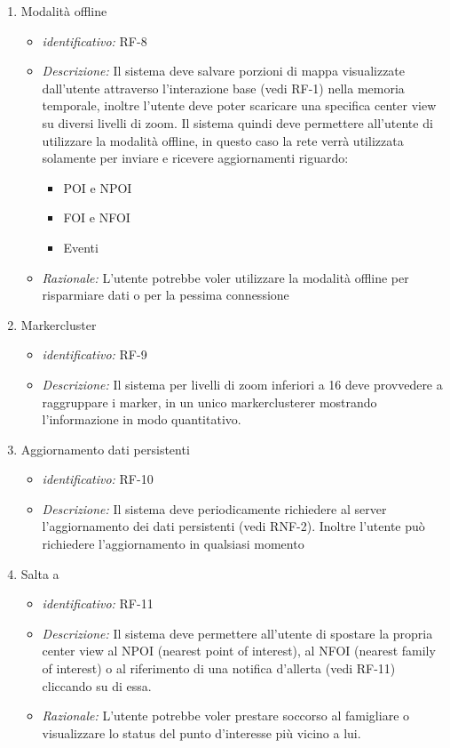 \begin{enumerate}
    \item Modalità offline
  \begin{itemize}
  \item\textit{identificativo:} RF-8
  \item\textit{Descrizione:} Il sistema deve salvare porzioni di mappa visualizzate dall’utente attraverso l’interazione base (vedi RF-1) nella memoria temporale, inoltre l’utente deve poter scaricare una specifica center view su diversi livelli di zoom. Il sistema quindi deve permettere all’utente di utilizzare la modalità offline, in questo caso la rete verrà utilizzata solamente per inviare e ricevere aggiornamenti riguardo:
    \begin{itemize}
    \item POI e NPOI
    \item FOI e NFOI
    \item Eventi
    \end{itemize}
   \item\textit{ Razionale:} L’utente potrebbe voler utilizzare la modalità offline per risparmiare dati o per la  pessima connessione
  \end{itemize}
  
   \item Markercluster
  \begin{itemize}
  \item\textit{identificativo:} RF-9
  \item\textit{Descrizione:} Il sistema per livelli di zoom inferiori a 16 deve provvedere a raggruppare i marker, in un unico markerclusterer mostrando l’informazione in modo quantitativo.
  \end{itemize}
  
    \item Aggiornamento dati persistenti
  \begin{itemize}
  \item\textit{identificativo:} RF-10
  \item\textit{Descrizione:} Il sistema deve periodicamente richiedere al server l’aggiornamento dei dati persistenti (vedi RNF-2).
Inoltre l’utente può richiedere l’aggiornamento in qualsiasi momento
  \end{itemize}
  
   \item Salta a
  \begin{itemize}
  \item\textit{identificativo:} RF-11
  \item\textit{Descrizione:} Il sistema deve permettere all’utente di spostare la propria center view al NPOI (nearest point of interest), al NFOI (nearest family of interest) o al riferimento di una notifica d’allerta (vedi RF-11) cliccando su di essa.
   \item\textit{ Razionale:} L’utente potrebbe voler prestare soccorso al famigliare o visualizzare lo status del punto d’interesse più vicino a lui.
  \end{itemize}
  

\end{enumerate}
